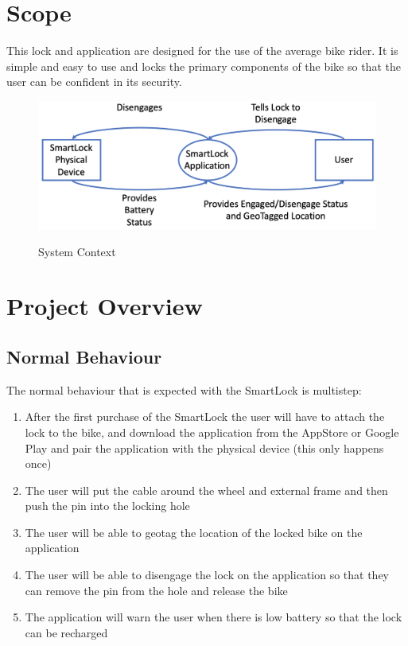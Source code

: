 \documentclass[12pt, titlepage]{article}
\begin{document}

\section{Scope}

This lock and application are designed for the use of the average bike rider. It is simple and easy to use and locks the primary components of the bike so that the user can be confident in its security. 

 \begin{figure}[h!]
 \begin{center}
 {
  \includegraphics[width=0.9\linewidth]{System Context.png}
 }
 \caption{\label{System Context} System Context}
 \end{center}
 \end{figure}



\section{Project Overview}

\subsection{Normal Behaviour}

The normal behaviour that is expected with the SmartLock is multistep:
\begin{enumerate}
\item After the first purchase of the SmartLock the user will have to attach the lock to the bike, and download the application from the AppStore or Google Play and pair the application with the physical device (this only happens once)
\item The user will put the cable around the wheel and external frame and then push the pin into the locking hole
\item The user will be able to geotag the location of the locked bike on the application
\item The user will be able to disengage the lock on the application so that they can remove the pin from the hole and release the bike
\item The application will warn the user when there is low battery so that the lock can be recharged
\end{enumerate}
\end{document}
